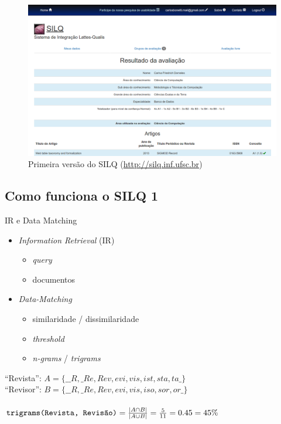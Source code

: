 \documentclass{beamer}
\newcommand{\quotes}[1]{``#1''}
\begin{document}
\begin{frame}
  \begin{figure}
    \includegraphics[width=\textwidth]{figuras/silq1-3.png}
    \caption{Primeira versão do SILQ (\url{http://silq.inf.ufsc.br})}
  \end{figure}
\end{frame}

\subsection{Como funciona o SILQ 1}

\begin{frame}{IR e Data Matching}
  \begin{itemize}
    \item \textit{Information Retrieval} (IR)
    \begin{itemize}
      \item \textit{query}
      \item documentos
    \end{itemize}

    \item \textit{Data-Matching}
    \begin{itemize}
      \item similaridade / dissimilaridade
      \item \textit{threshold}
      \item \textit{n-grams} / \textit{trigrams}
    \end{itemize}
  \end{itemize}

  \pause
  \small
  \quotes{Revista}: $ A = \{\_\_R,\_Re,Rev,evi,vis,ist,sta,ta\_\}$ \\
  \quotes{Revisor}: $ B = \{\_\_R,\_Re,Rev,evi,vis,iso,sor,or\_\}$ \\

  \hfill \\
  $
  \texttt{trigrams(Revista, Revisão)} = {|A \cap B| \over |A \cup B|} = {5 \over 11} = 0.45 = 45\%
  $
\end{frame}
\end{document}
